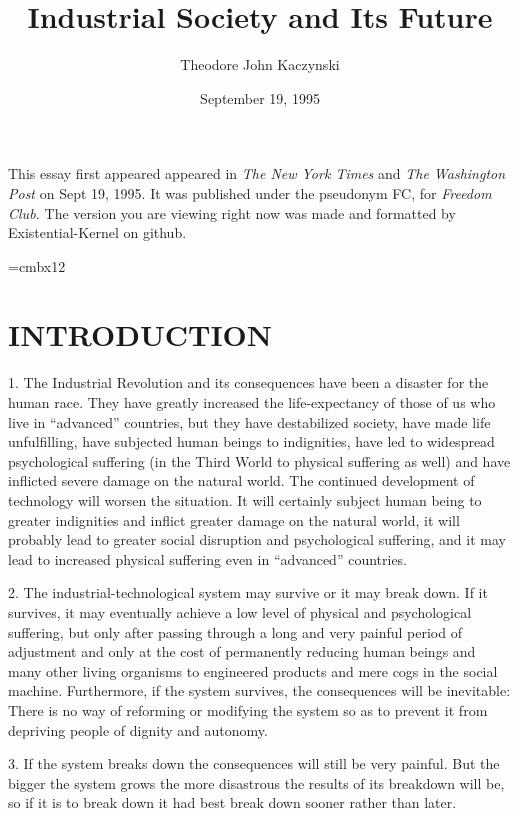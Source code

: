 \documentclass{article}
\title{Industrial Society and Its Future}
\author{\small{Theodore John Kaczynski}}
\date{\small{September 19, 1995}}
\begin{document}
\maketitle
\small{This essay first appeared appeared in \textit{The New York Times} and \textit{The Washington Post} on Sept 19, 1995. It was published under the pseudonym FC, for \textit{Freedom Club.} The version you are viewing right now was made and formatted by Existential-Kernel on github.}
\clearpage

\font\twelvebf=cmbx12

\section{INTRODUCTION}
\hspace{0.5cm} 1. The Industrial Revolution and its consequences have been a disaster for the human race. They have greatly increased the life-expectancy of those of us who live in “advanced” countries, but they have destabilized society, have made life unfulfilling, have subjected human beings to indignities, have led to widespread psychological suffering (in the Third World to physical suffering as well) and have inflicted severe damage on the natural world. The continued 
development of technology will worsen the situation. It will certainly subject human being to greater indignities and inflict greater damage on the natural world, it will probably lead to greater 
social disruption and psychological suffering, and it may lead to increased physical suffering even 
in “advanced” countries. \vspace{\baselineskip}

2. The industrial-technological system may survive or it may break down. If it survives, it may 
eventually achieve a low level of physical and psychological suffering, but only after passing through a long and very painful period of adjustment and only at the cost of permanently reducing human beings and many other living organisms to engineered products and mere cogs in the social 
machine. Furthermore, if the system survives, the consequences will be inevitable: There is no way of reforming or modifying the system so as to prevent it from depriving people of dignity and 
autonomy. \vspace{\baselineskip}

3. If the system breaks down the consequences will still be very painful. But the bigger the system 
grows the more disastrous the results of its breakdown will be, so if it is to break down it had best 
break down sooner rather than later. \vspace{\baselineskip}
\end{document}
